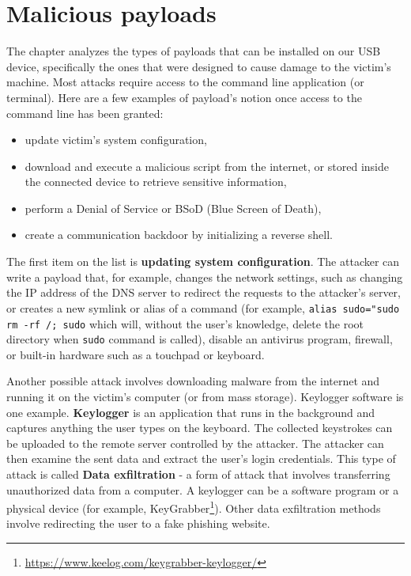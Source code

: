 
\chapter{Malicious payloads}
\label{ch:malicious_payloads}
The chapter analyzes the types of payloads that can be installed on our USB device, specifically the ones that were designed to cause damage to the victim's machine. Most attacks require access to the command line application (or terminal). Here are a few examples of payload's notion once access to the command line has been granted:

\begin{itemize}
    \item update victim's system configuration,
    \item download and execute a malicious script from the internet, or stored inside the connected device to retrieve sensitive information,
    \item perform a Denial of Service or BSoD (Blue Screen of Death),
    \item create a communication backdoor by initializing a reverse shell.
\end{itemize}

The first item on the list is \textbf{updating system configuration}. The attacker can write a payload that, for example, changes the network settings, such as changing the IP address of the DNS server to redirect the requests to the attacker's server, or creates a new symlink or alias of a command (for example, \verb|alias sudo="sudo rm -rf /; sudo| which will, without the user's knowledge, delete the root directory when \verb|sudo| command is called), disable an antivirus program, firewall, or built-in hardware such as a touchpad or keyboard.

Another possible attack involves downloading malware from the internet and running it on the victim's computer (or from mass storage). Keylogger software is one example. \textbf{Keylogger} is an application that runs in the background and captures anything the user types on the keyboard. The collected keystrokes can be uploaded to the remote server controlled by the attacker. The attacker can then examine the sent data and extract the user's login credentials. This type of attack is called \textbf{Data exfiltration} \-- a form of attack that involves transferring unauthorized data from a computer. A keylogger can be a software program or a physical device (for example, KeyGrabber\footnote{\url{https://www.keelog.com/keygrabber-keylogger/}}). Other data exfiltration methods involve redirecting the user to a fake phishing website.

